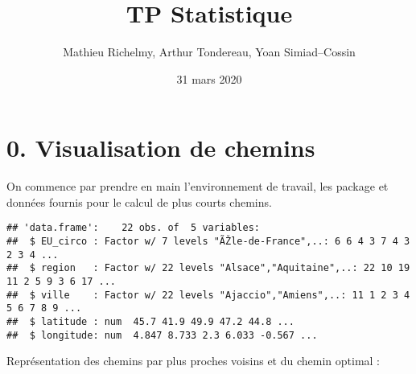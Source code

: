 \documentclass[
]{article}
\title{TP Statistique}
\author{Mathieu Richelmy, Arthur Tondereau, Yoan Simiad--Cossin}
\date{31 mars 2020}
\newenvironment{Shaded}{\begin{snugshade}}{\end{snugshade}}
\newcommand{\DataTypeTok}[1]{\textcolor[rgb]{0.13,0.29,0.53}{#1}}
\newcommand{\DecValTok}[1]{\textcolor[rgb]{0.00,0.00,0.81}{#1}}
\newcommand{\KeywordTok}[1]{\textcolor[rgb]{0.13,0.29,0.53}{\textbf{#1}}}
\newcommand{\NormalTok}[1]{#1}
\newcommand{\OperatorTok}[1]{\textcolor[rgb]{0.81,0.36,0.00}{\textbf{#1}}}
\newcommand{\StringTok}[1]{\textcolor[rgb]{0.31,0.60,0.02}{#1}}
\begin{document}
\maketitle

\hypertarget{visualisation-de-chemins}{%
\section{0. Visualisation de chemins}\label{visualisation-de-chemins}}

On commence par prendre en main l'environnement de travail, les package
et données fournis pour le calcul de plus courts chemins.

\begin{verbatim}
## 'data.frame':    22 obs. of  5 variables:
##  $ EU_circo : Factor w/ 7 levels "ÃŽle-de-France",..: 6 6 4 3 7 4 3 2 3 4 ...
##  $ region   : Factor w/ 22 levels "Alsace","Aquitaine",..: 22 10 19 11 2 5 9 3 6 17 ...
##  $ ville    : Factor w/ 22 levels "Ajaccio","Amiens",..: 11 1 2 3 4 5 6 7 8 9 ...
##  $ latitude : num  45.7 41.9 49.9 47.2 44.8 ...
##  $ longitude: num  4.847 8.733 2.3 6.033 -0.567 ...
\end{verbatim}

Représentation des chemins par plus proches voisins et du chemin optimal
:

\begin{Shaded}
\end{Shaded}
\end{document}
